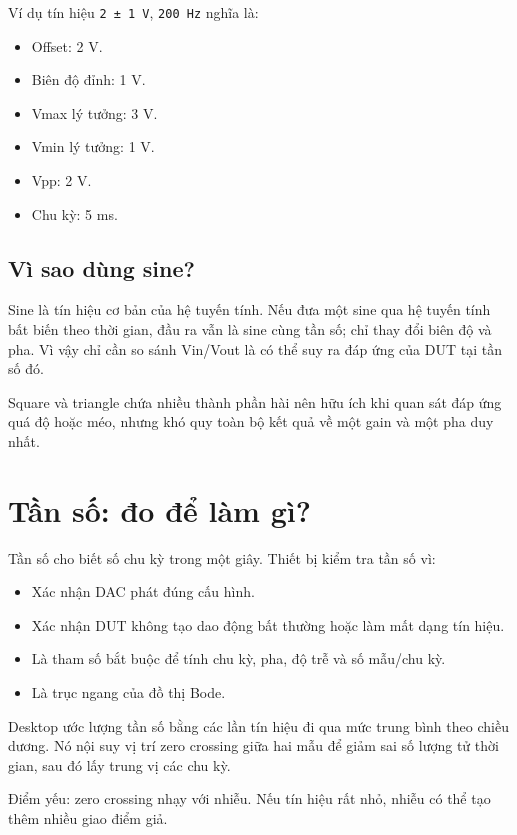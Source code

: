 \documentclass[12pt,a4paper,oneside]{article}
\newcommand{\inlinecode}[1]{\texttt{#1}}
\begin{document}
Ví dụ tín hiệu \inlinecode{2 ± 1 V}, \inlinecode{200 Hz} nghĩa là:

\begin{itemize}
\item Offset: 2 V.
\item Biên độ đỉnh: 1 V.
\item Vmax lý tưởng: 3 V.
\item Vmin lý tưởng: 1 V.
\item Vpp: 2 V.
\item Chu kỳ: 5 ms.
\end{itemize}

\subsection{Vì sao dùng sine?}

Sine là tín hiệu cơ bản của hệ tuyến tính. Nếu đưa một sine qua hệ tuyến tính bất biến theo thời gian, đầu ra vẫn là sine cùng tần số; chỉ thay đổi biên độ và pha. Vì vậy chỉ cần so sánh Vin/Vout là có thể suy ra đáp ứng của DUT tại tần số đó.

Square và triangle chứa nhiều thành phần hài nên hữu ích khi quan sát đáp ứng quá độ hoặc méo, nhưng khó quy toàn bộ kết quả về một gain và một pha duy nhất.

\section{Tần số: đo để làm gì?}

Tần số cho biết số chu kỳ trong một giây. Thiết bị kiểm tra tần số vì:

\begin{itemize}
\item Xác nhận DAC phát đúng cấu hình.
\item Xác nhận DUT không tạo dao động bất thường hoặc làm mất dạng tín hiệu.
\item Là tham số bắt buộc để tính chu kỳ, pha, độ trễ và số mẫu/chu kỳ.
\item Là trục ngang của đồ thị Bode.
\end{itemize}

Desktop ước lượng tần số bằng các lần tín hiệu đi qua mức trung bình theo chiều dương. Nó nội suy vị trí zero crossing giữa hai mẫu để giảm sai số lượng tử thời gian, sau đó lấy trung vị các chu kỳ.

Điểm yếu: zero crossing nhạy với nhiễu. Nếu tín hiệu rất nhỏ, nhiễu có thể tạo thêm nhiều giao điểm giả.
\end{document}

